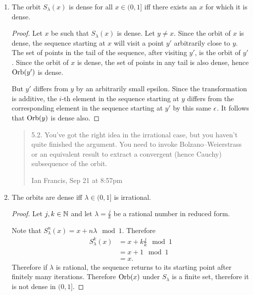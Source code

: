 \begin{enumerate}[label=(5.\arabic*)]

\item
  \begin{claim*}
    The orbit $S_{\lambda}(x)$ is dense for all $x \in (0, 1]$ iff there exists an $x$ for which it is dense.
  \end{claim*}
  \begin{proof}
    Let $x$ be such that $S_\lambda(x)$ is dense. Let $y \neq x$. Since the orbit of $x$ is dense, the sequence
    starting at $x$ will visit a point $y'$ arbitrarily close to $y$. The set of points in the tail of the
    sequence, after visiting $y'$, is the orbit of $y'$. Since the orbit of $x$ is dense, the set of points in
    any tail is also dense, hence $\text{Orb}(y')$ is dense.

    But $y'$ differs from $y$ by an arbitrarily small epsilon. Since the transformation is additive, the $i$-th
    element in the sequence starting at $y$ differs from the corresponding element in the sequence starting
    at $y'$ by this same $\epsilon$. It follows that $\text{Orb}(y)$ is dense also.
  \end{proof}

  \begin{quote}
5.2. You've got the right idea in the irrational case, but you haven't quite finished the argument. You need to
invoke Bolzano–Weierstrass or an equivalent result to extract a convergent (hence Cauchy) subsequence of the
orbit.

Ian Francis, Sep 21 at 8:57pm
  \end{quote}

\item
  \begin{claim*}
    The orbits are dense iff $\lambda \in (0, 1]$ is irrational.
  \end{claim*}
  \begin{proof}
    Let $j, k \in \mathbb{N}$ and let $\lambda = \frac{j}{k}$ be a rational number in reduced form.

    Note that $S^n_\lambda(x) = x + n\lambda \mod 1$. Therefore
    \begin{align*}
      S^k_\lambda(x)
      &= x + k\frac{j}{k} \mod 1 \\
      &= x + 1 \mod 1 \\
      &= x.
    \end{align*}
    Therefore if $\lambda$ is rational, the sequence returns to its starting point after finitely many
    iterations. Therefore $\text{Orb}(x)$ under $S_\lambda$ is a finite set, therefore it is not dense in $(0, 1]$.


\end{proof}
\end{enumerate}
